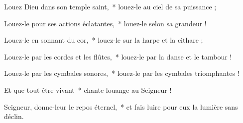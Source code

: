 \item Louez Dieu dans son temple saint,~* louez-le au ciel de sa puissance ;

\item Louez-le pour ses actions éclatantes,~* louez-le selon sa grandeur !

\item Louez-le en sonnant du cor,~* louez-le sur la harpe et la cithare ;

\item Louez-le par les cordes et les flûtes,~* louez-le par la danse et le tambour !

\item Louez-le par les cymbales sonores,~* louez-le par les cymbales triomphantes !

\item Et que tout être vivant~* chante louange au Seigneur !

\item Seigneur, donne-leur le repos éternel,~* et fais luire pour eux la lumière sans déclin.